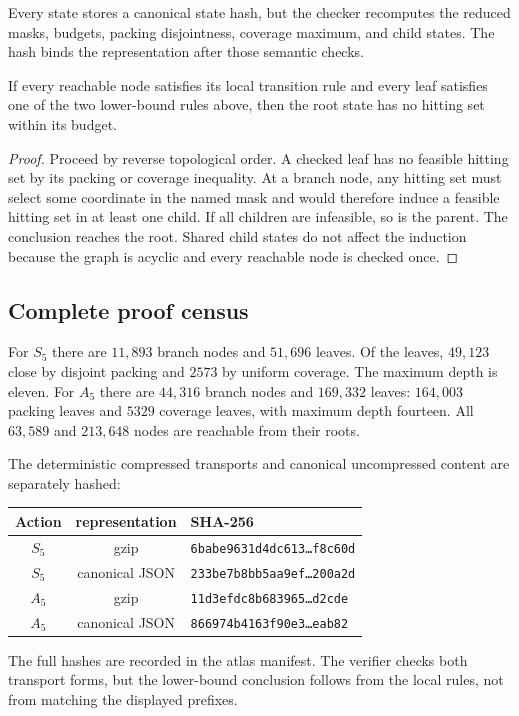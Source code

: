 Every state stores a canonical state hash, but the checker recomputes the
reduced masks, budgets, packing disjointness, coverage maximum, and child
states.  The hash binds the representation after those semantic checks.

\begin{lemma}
If every reachable node satisfies its local transition rule and every leaf
satisfies one of the two lower-bound rules above, then the root state has no
hitting set within its budget.
\end{lemma}

\begin{proof}
Proceed by reverse topological order.  A checked leaf has no feasible hitting
set by its packing or coverage inequality.  At a branch node, any hitting set
must select some coordinate in the named mask and would therefore induce a
feasible hitting set in at least one child.  If all children are infeasible,
so is the parent.  The conclusion reaches the root.  Shared child states do
not affect the induction because the graph is acyclic and every reachable
node is checked once.
\end{proof}

\subsection{Complete proof census}

For $S_5$ there are $11{,}893$ branch nodes and $51{,}696$ leaves.  Of the
leaves, $49{,}123$ close by disjoint packing and $2573$ by uniform coverage.
The maximum depth is eleven.  For $A_5$ there are $44{,}316$ branch nodes and
$169{,}332$ leaves: $164{,}003$ packing leaves and $5329$ coverage leaves,
with maximum depth fourteen.  All $63{,}589$ and $213{,}648$ nodes are
reachable from their roots.

The deterministic compressed transports and canonical uncompressed content
are separately hashed:
\begin{center}
\small
\begin{tabular}{ccl}
\toprule
Action & representation & SHA-256\\
\midrule
$S_5$ & gzip & \texttt{6babe9631d4dc613\ldots f8c60d}\\
$S_5$ & canonical JSON & \texttt{233be7b8bb5aa9ef\ldots200a2d}\\
$A_5$ & gzip & \texttt{11d3efdc8b683965\ldots d2cde}\\
$A_5$ & canonical JSON & \texttt{866974b4163f90e3\ldots eab82}\\
\bottomrule
\end{tabular}
\end{center}
The full hashes are recorded in the atlas manifest.  The verifier checks both
transport forms, but the lower-bound conclusion follows from the local rules,
not from matching the displayed prefixes.
